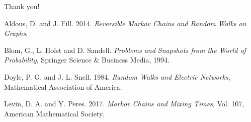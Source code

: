 \documentclass[12pt]{beamer}
\begin{document}
\begin{frame}{Thank you!}
\begin{thebibliography}{9}

	Aldous, D. and J. Fill.
	2014.
	\textit{Reversible Markov Chains and Random Walks on Graphs}.

	Blom, G., L. Holst and D. Sandell.
	\textit{Problems and Snapshots from the World of Probability},
	Springer Science \& Business Media, 1994.

	Doyle, P. G. and J. L. Snell.
	1984.
	\textit{Random Walks and Electric Networks},
	Mathematical Association of America.
 
	Levin, D. A. and Y. Peres.
	2017.
	\textit{Markov Chains and Mixing Times},
	Vol. 107,
	American Mathematical Society.

\end{thebibliography}
\end{frame}
\end{document}
